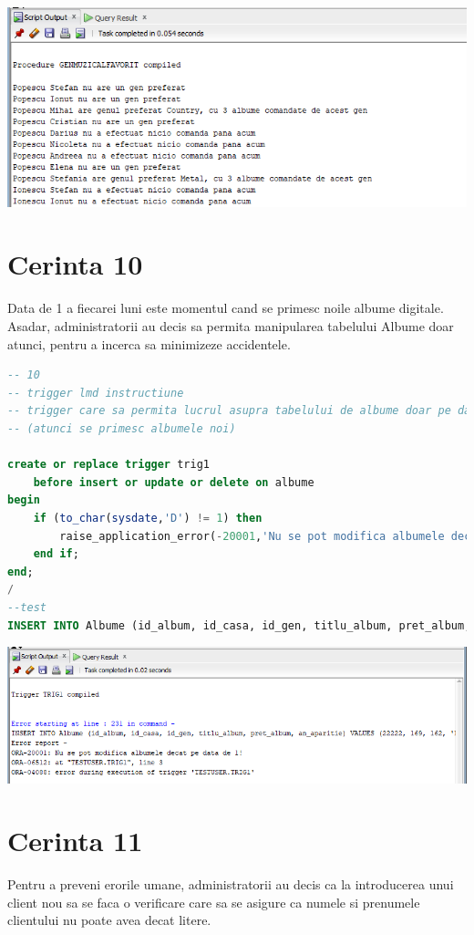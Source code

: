 \documentclass{article}
\begin{document}
\includegraphics[width=\textwidth]{9.png}

\newpage
\section{Cerinta 10}
Data de 1 a fiecarei luni este momentul cand se primesc noile albume digitale. Asadar, administratorii au decis sa permita manipularea tabelului Albume doar atunci, pentru a incerca sa minimizeze accidentele.

\begin{lstlisting}[language=SQL, title=Cerinta 10]
-- 10
-- trigger lmd instructiune
-- trigger care sa permita lucrul asupra tabelului de albume doar pe data de 1 a fiecarei luna
-- (atunci se primesc albumele noi)

create or replace trigger trig1
    before insert or update or delete on albume
begin
    if (to_char(sysdate,'D') != 1) then
    	raise_application_error(-20001,'Nu se pot modifica albumele decat pe data de 1!');
    end if;
end;
/
--test
INSERT INTO Albume (id_album, id_casa, id_gen, titlu_album, pret_album, an_aparitie) VALUES (22222, 169, 162, 'Damage control', 61, 1979);
\end{lstlisting}

\vspace{0.5cm}

\includegraphics[width=\textwidth]{10.png}

\newpage
\section{Cerinta 11}
Pentru a preveni erorile umane, administratorii au decis ca la introducerea unui client nou sa se faca o verificare care sa se asigure ca numele si prenumele clientului nu poate avea decat litere.
\end{document}
